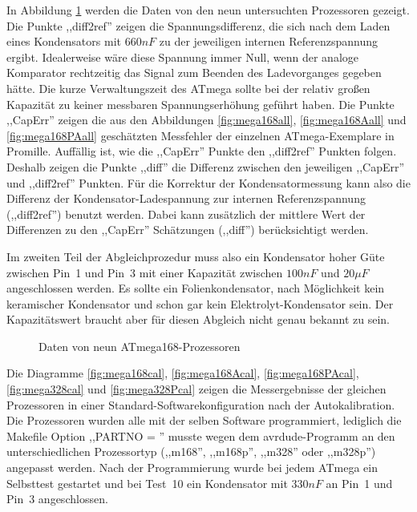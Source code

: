 In Abbildung \ref{fig:CompAdjust} werden die Daten von den neun untersuchten Prozessoren gezeigt.
Die Punkte ,,diff2ref'' zeigen die Spannungsdifferenz, die sich nach dem Laden eines Kondensators mit \(660nF\) zu der
jeweiligen internen Referenzspannung ergibt. Idealerweise wäre diese Spannung immer Null, wenn der analoge
Komparator rechtzeitig das Signal zum Beenden des Ladevorganges gegeben hätte. Die kurze Verwaltungszeit des ATmega
sollte bei der relativ großen Kapazität zu keiner messbaren Spannungserhöhung geführt haben.
Die Punkte ,,CapErr'' zeigen die aus den Abbildungen \ref{fig:mega168all}, \ref{fig:mega168Aall} und \ref{fig:mega168PAall} 
geschätzten Messfehler der einzelnen ATmega-Exemplare in Promille.
Auffällig ist, wie die ,,CapErr'' Punkte den ,,diff2ref'' Punkten folgen.
Deshalb zeigen die Punkte ,,diff'' die Differenz zwischen den jeweiligen ,,CapErr'' und ,,diff2ref'' Punkten.
Für die Korrektur der Kondensatormessung kann also die Differenz der Kondensator-Ladespannung zur internen Referenzspannung
(,,diff2ref'') benutzt werden.
Dabei kann zusätzlich der mittlere Wert der Differenzen zu den ,,CapErr'' Schätzungen (,,diff'') berücksichtigt werden.

Im zweiten Teil der Abgleichprozedur muss also ein Kondensator hoher Güte zwischen Pin~1 und Pin~3 mit einer
Kapazität zwischen \(100nF\) und \(20\mu F\) angeschlossen werden. 
Es sollte ein Folienkondensator, nach Möglichkeit kein keramischer Kondensator und schon gar kein
Elektrolyt-Kondensator sein. Der Kapazitätswert braucht aber für diesen Abgleich nicht genau bekannt zu sein.

\begin{figure}[H]
\centering

\caption{Daten von neun ATmega168-Prozessoren}
\label{fig:CompAdjust}
\end{figure}

Die Diagramme \ref{fig:mega168cal}, \ref{fig:mega168Acal}, \ref{fig:mega168PAcal},  \ref{fig:mega328cal} und
\ref{fig:mega328Pcal} zeigen die Messergebnisse
der gleichen Prozessoren in einer Standard-Softwarekonfiguration nach der Autokalibration.
Die Prozessoren wurden alle mit der selben Software programmiert, lediglich die Makefile Option ,,PARTNO = '' musste 
wegen dem avrdude-Programm an den unterschiedlichen Prozessortyp (,,m168'', ,,m168p'', ,,m328'' oder ,,m328p'') angepasst werden.
Nach der Programmierung wurde bei jedem ATmega ein
Selbsttest gestartet und bei Test~10 ein Kondensator mit \(330nF\) an Pin~1 und Pin~3 angeschlossen.

